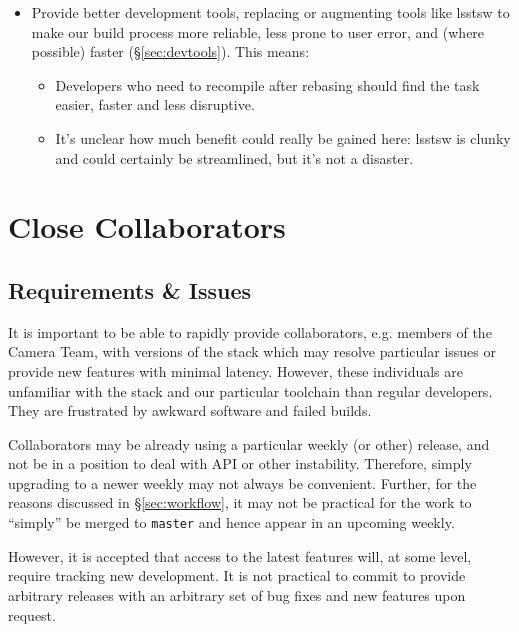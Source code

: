 \documentclass[DM,toc]{lsstdoc}
\begin{document}
\begin{itemize}
{\begin{itemize}
    \end{itemize}

  }

  \item{Provide better development tools, replacing or augmenting tools like
  lsstsw to make our build process more reliable, less prone to user error,
  and (where possible) faster (\S\ref{sec:devtools}). This means:

    \begin{itemize}

      \item{Developers who need to recompile after rebasing should find the
      task easier, faster and less disruptive.}

      \item{It's unclear how much benefit could really be gained here: lsstsw
      is clunky and could certainly be streamlined, but it's not a disaster.}

    \end{itemize}

  }

\end{itemize}

\section{Close Collaborators}
\label{sec:collaborators}

\subsection{Requirements \& Issues}

It is important to be able to rapidly provide collaborators, e.g. members of
the Camera Team, with versions of the stack which may resolve particular
issues or provide new features with minimal latency. However, these
individuals are unfamiliar with the stack and our particular toolchain than
regular developers. They are frustrated by awkward software and failed builds.

Collaborators may be already using a particular weekly (or other) release, and
not be in a position to deal with API or other instability. Therefore, simply
upgrading to a newer weekly may not always be convenient. Further, for the
reasons discussed in \S\ref{sec:workflow}, it may not be practical for the
work to ``simply'' be merged to \texttt{master} and hence appear in an
upcoming weekly.

However, it is accepted that access to the latest features will, at some
level, require tracking new development. It is not practical to commit to
provide arbitrary releases with an arbitrary set of bug fixes and new features
upon request.
\end{document}
